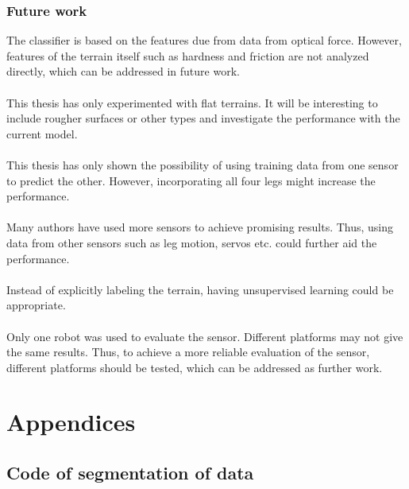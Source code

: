 \documentclass[USenglish]{ifimaster}  %
\begin{document}
\section{Future work}
The classifier is based on the features due from data from optical force. However, features of the terrain itself such as hardness and friction are not analyzed directly, which can be addressed in future work. 
\\
\\
This thesis has only experimented with flat terrains. It will be interesting to include rougher surfaces or other types and investigate the performance with the current model. 
\\
\\
This thesis has only shown the possibility of using training data from one sensor to predict the other. However, incorporating all four legs might increase the performance. 
\\
\\
Many authors have used more sensors to achieve promising results. Thus, using data from other sensors such as leg motion, servos etc. could further aid the performance.
\\
\\
Instead of explicitly labeling the terrain, having unsupervised learning could be appropriate.  
\\
\\
Only one robot was used to evaluate the sensor. Different platforms may not give the same results. Thus, to achieve a more reliable evaluation of the sensor, different platforms should be tested, which can be addressed as further work.

	


\part*{Appendices} 
\appendix
\chapter{Code of segmentation of data} \label{ap:code}

\end{document}

